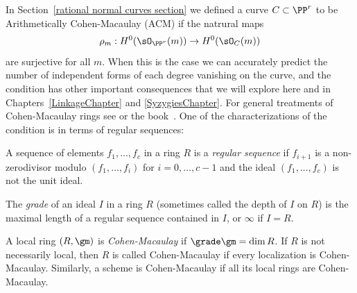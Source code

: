 In Section~\ref{rational normal curves section} we defined a curve $C\subset \PP^{r}$ to be Arithmetically Cohen-Macaulay (ACM) if the natrural maps
$$
\rho_m: H^0(\sO_{\PP^r}(m)) \to H^0(\sO_{C}(m))
$$
are surjective for all $m$. When this is the case we can accurately predict the number of independent forms of
each degree vanishing on the curve, and the condition has other important consequences that we will explore here and in Chapters~\ref{LinkageChapter} and \ref{SyzygiesChapter}. For general treatments of 
Cohen-Macaulay rings see \cite[Chapter 18]{Eisenbud1995} or the book~\cite{BrunsHerzog}. One of the characterizations of the condition is in terms of regular sequences:

\begin{definition}\label{gradeDef}
A sequence of elements $f_{1}, \dots, f_{c}$ in a ring $R$ is a \emph{regular sequence} if
$f_{i+1}$ is a non-zerodivisor modulo $(f_{1}, \dots, f_{i})$ for $i = 0,\dots, c-1$ and the ideal
$(f_{1}, \dots, f_{c})$ is not the unit ideal. 

The \emph{grade} of an ideal $I$ in a ring  $R$ (sometimes called the depth of $I$ on $R$) is the maximal length of a regular sequence contained in $I$, or $\infty$ if $I = R$. 

A local ring $(R,\gm)$ is \emph{Cohen-Macaulay} if $\grade \gm = \dim R$. If $R$ is not necessarily local, then 
$R$ is called Cohen-Macaulay if every localization is Cohen-Macaulay. Similarly, a scheme is Cohen-Macaulay if
all its local rings are Cohen-Macaulay.
\end{definition}

